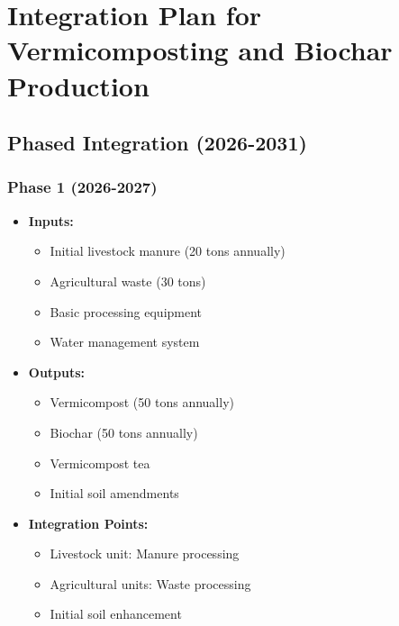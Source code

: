 \section{Integration Plan for Vermicomposting and Biochar Production}

\subsection{Phased Integration (2026-2031)}

\subsubsection{Phase 1 (2026-2027)}
\begin{itemize}
    \item \textbf{Inputs:}
    \begin{itemize}
        \item Initial livestock manure (20 tons annually)
        \item Agricultural waste (30 tons)
        \item Basic processing equipment
        \item Water management system
    \end{itemize}
    \item \textbf{Outputs:}
    \begin{itemize}
        \item Vermicompost (50 tons annually)
        \item Biochar (50 tons annually)
        \item Vermicompost tea
        \item Initial soil amendments
    \end{itemize}
    \item \textbf{Integration Points:}
    \begin{itemize}
        \item Livestock unit: Manure processing
        \item Agricultural units: Waste processing
        \item Initial soil enhancement
    \end{itemize}
\end{itemize}

